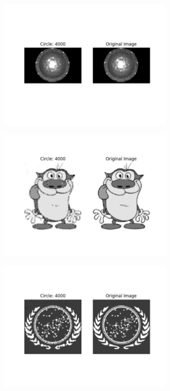 \documentclass[12pt]{article}
\begin{document}
\begin{figure}[H]
\centering
\noindent\includegraphics[width=0.75\textwidth]{../results/stargate/stargate_4000}
\end{figure}
\begin{figure}[H]
\centering
\noindent\includegraphics[width=0.75\textwidth]{../results/stimpy/stimpy_4000}
\end{figure}
\begin{figure}[H]
\centering
\noindent\includegraphics[width=0.75\textwidth]{../results/ufop/ufop_4000}
\end{figure}
\end{document}
